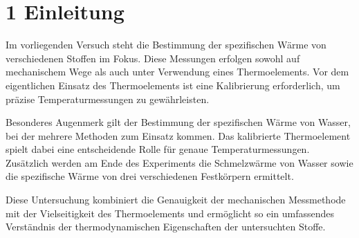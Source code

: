 \chapter*{1 Einleitung}
\setcounter{chapter}{1}
\setcounter{section}{0}
\setcounter{subsection}{0}

Im vorliegenden Versuch steht die Bestimmung der spezifischen Wärme von verschiedenen Stoffen im Fokus. Diese Messungen erfolgen sowohl auf mechanischem Wege als auch unter Verwendung eines Thermoelements. Vor dem eigentlichen Einsatz des Thermoelements ist eine Kalibrierung erforderlich, um präzise Temperaturmessungen zu gewährleisten.

Besonderes Augenmerk gilt der Bestimmung der spezifischen Wärme von Wasser, bei der mehrere Methoden zum Einsatz kommen. Das kalibrierte Thermoelement spielt dabei eine entscheidende Rolle für genaue Temperaturmessungen. Zusätzlich werden am Ende des Experiments die Schmelzwärme von Wasser sowie die spezifische Wärme von drei verschiedenen Festkörpern ermittelt.

Diese Untersuchung kombiniert die Genauigkeit der mechanischen Messmethode mit der Vielseitigkeit des Thermoelements und ermöglicht so ein umfassendes Verständnis der thermodynamischen Eigenschaften der untersuchten Stoffe.